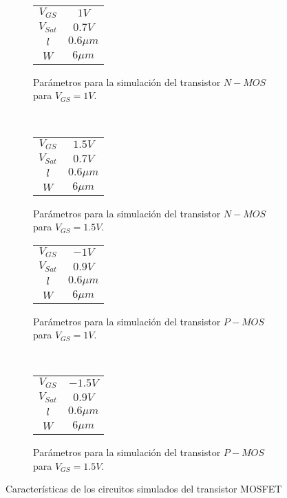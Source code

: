 \documentclass[9pt,technote]{IEEEtran}
\begin{document}
	\begin{figure}[H]
		\begin{subfigure}[t]{0.45\columnwidth}
			\centering
			\begin{tabular}{|c|c|}
				\hline
				$V_{GS}$ & $1V$ \\ 
				$V_{Sat}$ & $0.7V$ \\ 
				$l$ & $0.6\mu m$ \\ 
				$W$ & $6\mu m$ \\
				\hline
			\end{tabular}
			\caption{Parámetros para la simulación del transistor $N-MOS$ para $V_{GS}=1V$.}
			\label{Tabla:VG1_nmos:1}
		\end{subfigure}%
		~
		\begin{subfigure}[t]{0.45\columnwidth}
			\centering
			\begin{tabular}{|c|c|} 
				\hline
				$V_{GS}$ & $1.5V$ \\ 
				$V_{Sat}$ & $0.7V$ \\ 
				$l$ & $0.6\mu m$ \\ 
				$W$ & $6\mu m$ \\
				\hline 
			\end{tabular}
			\caption{Parámetros para la simulación del transistor $N-MOS$ para $V_{GS}=1.5V$.}
			\label{Tabla:VG1.5_nmos:1}
		\end{subfigure}
		\hfill
		\begin{subfigure}[t]{0.45\columnwidth}
			\centering
			\begin{tabular}{|c|c|} 
				\hline
				$V_{GS}$ & $-1V$ \\ 
				$V_{Sat}$ & $0.9V$ \\ 
				$l$ & $0.6\mu m$ \\ 
				$W$ & $6\mu m$ \\
				\hline
			\end{tabular}
			\caption{Parámetros para la simulación del transistor $P-MOS$ para $V_{GS}=1V$.}
			\label{Tabla:VG1_pmos:1}
		\end{subfigure}%
		~
		\hfill
		\begin{subfigure}[t]{0.45\columnwidth}
			\centering
			\begin{tabular}{|c|c|}
				\hline
				$V_{GS}$ & $-1.5V$ \\ 
				$V_{Sat}$ & $0.9V$ \\ 
				$l$ & $0.6\mu m$ \\ 
				$W$ & $6\mu m$ \\
				\hline
			\end{tabular}
			\caption{Parámetros para la simulación del transistor $P-MOS$ para $V_{GS}=1.5V$.}
			\label{Tabla:VG1.5_pmos:1}
		\end{subfigure}%
		\caption{Características de los circuitos simulados del transistor MOSFET}
		\label{fig:simulaciones_transistores}
	\end{figure}
	
\end{document}
